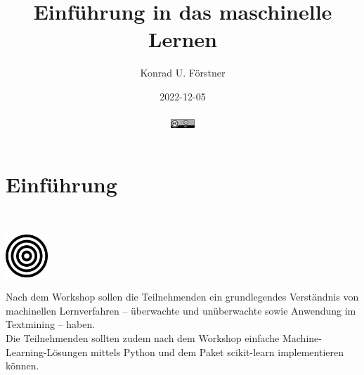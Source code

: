 \documentclass[aspectratio=169]{beamer}
\title{Einführung in das maschinelle Lernen}
\author{\small Konrad U. Förstner}
\institute{ZB MED -- Informationszentrum Lebenswissenschaften \& TH Köln}
\date{\scriptsize 
  2022-12-05\\\ \\
  \href{https://creativecommons.org/licenses/by/4.0/}{\includegraphics[width=0.88cm]{images/creative_commons_attribute.png}}
}
\begin{document}

\begin{frame}{}
  \titlepage
\end{frame}

\logo{}


\setcounter{tocdepth}{1}
\begin{frame}{}
   \tableofcontents
\end{frame}

\section{Einführung}

\begin{frame}
  \begin{block}{}
    \vspace{0.5cm}
    \ \ \ \
    \begin{minipage}{0.10\textwidth}
      \begin{center}
        \includegraphics[width=1.6cm]{images/publicdomainvectors_target-plain.pdf}
      \end{center}        
    \end{minipage}
    \hfill
    \begin{minipage}{0.80\textwidth}
      Nach dem Workshop sollen die Teilnehmenden ein grundlegendes
      Verständnis von machinellen Lernverfahren -- überwachte und
      unüberwachte sowie Anwendung im Textmining -- haben.\\

      Die Teilnehmenden sollten zudem nach dem Workshop einfache
      Machine-Learning-Lösungen mittels Python und dem Paket
      scikit-learn implementieren können.
    \end{minipage}
    \vspace{0.3cm}
  \end{block}
\end{frame}

\begin{frame}{}
   \tableofcontents[currentsection]
\end{frame}
\end{document}
